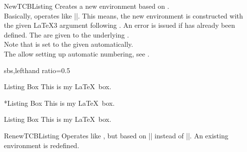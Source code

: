 

\clearpage

\begin{docCommand}{NewTCBListing}{}
  Creates a new environment  based on .\\
  Basically,  operates like |\NewDocumentEnvironment|. This means,
  the new environment  is constructed with the
  given \LaTeX3 argument  following \cite{latexproject:usrguide}.
  An error is issued if  has already been defined.
  The  are given to the underlying .\\
  Note that  is set to the given 
  automatically.\\
  The  allow setting up automatic numbering,
  see .

\begin{dispExample*}{sbs,lefthand ratio=0.5}

\begin{mybox}{Listing Box}
This is my
\LaTeX\ box.
\end{mybox}
\bigskip

\begin{mybox}*{Listing Box}
This is my
\LaTeX\ box.
\end{mybox}
\bigskip

\begin{mybox}[colback=yellow]
  {Listing Box}
This is my
\LaTeX\ box.
\end{mybox}
\end{dispExample*}
\end{docCommand}

\begin{docCommand}{RenewTCBListing}{}
  Operates like , but based on |\RenewDocumentEnvironment| instead of |\NewDocumentEnvironment|.
  An existing environment is redefined.
\end{docCommand}

